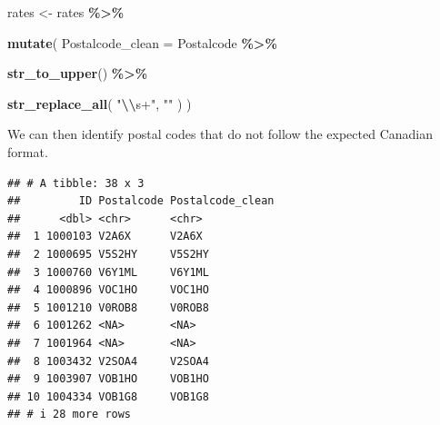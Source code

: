 \documentclass[
  11pt,
  oneside]{book}
\newenvironment{Shaded}{\begin{snugshade}}{\end{snugshade}}
\newcommand{\AttributeTok}[1]{\textcolor[rgb]{0.13,0.29,0.53}{#1}}
\newcommand{\FunctionTok}[1]{\textcolor[rgb]{0.13,0.29,0.53}{\textbf{#1}}}
\newcommand{\NormalTok}[1]{#1}
\newcommand{\OtherTok}[1]{\textcolor[rgb]{0.56,0.35,0.01}{#1}}
\newcommand{\SpecialCharTok}[1]{\textcolor[rgb]{0.81,0.36,0.00}{\textbf{#1}}}
\newcommand{\StringTok}[1]{\textcolor[rgb]{0.31,0.60,0.02}{#1}}
\begin{document}
\begin{Shaded}
\begin{Highlighting}[]
\NormalTok{rates }\OtherTok{\textless{}{-}}\NormalTok{ rates }\SpecialCharTok{\%\textgreater{}\%}
  
  \FunctionTok{mutate}\NormalTok{(}
    \AttributeTok{Postalcode\_clean =}
\NormalTok{      Postalcode }\SpecialCharTok{\%\textgreater{}\%}
      
      \FunctionTok{str\_to\_upper}\NormalTok{() }\SpecialCharTok{\%\textgreater{}\%}
      
      \FunctionTok{str\_replace\_all}\NormalTok{(}
        \StringTok{"}\SpecialCharTok{\textbackslash{}\textbackslash{}}\StringTok{s+"}\NormalTok{,}
        \StringTok{""}
\NormalTok{      )}
\NormalTok{  )}
\end{Highlighting}
\end{Shaded}

We can then identify postal codes that do not follow the expected Canadian format.

\begin{Shaded}
\end{Shaded}

\begin{verbatim}
## # A tibble: 38 x 3
##         ID Postalcode Postalcode_clean
##      <dbl> <chr>      <chr>           
##  1 1000103 V2A6X      V2A6X           
##  2 1000695 V5S2HY     V5S2HY          
##  3 1000760 V6Y1ML     V6Y1ML          
##  4 1000896 VOC1HO     VOC1HO          
##  5 1001210 V0ROB8     V0ROB8          
##  6 1001262 <NA>       <NA>            
##  7 1001964 <NA>       <NA>            
##  8 1003432 V2SOA4     V2SOA4          
##  9 1003907 VOB1HO     VOB1HO          
## 10 1004334 VOB1G8     VOB1G8          
## # i 28 more rows
\end{verbatim}
\end{document}

